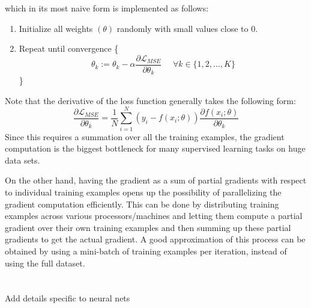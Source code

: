  which in its most naive form is implemented as follows:
\begin{enumerate}
\item Initialize all weights $(\theta)$ randomly with small values close to 0.
\item Repeat until convergence \{
\begin{equation*}
\theta_k := \theta_k - \alpha \frac{\partial \mathcal{L}_{MSE}}{\partial \theta_k} \hspace{16pt} \forall k \in \{1,2,...,K\}
\end{equation*}
\}
\end{enumerate}
Note that the derivative of the loss function generally takes the following form:
\begin{equation*}
\frac{\partial \mathcal{L}_{MSE}}{\partial \theta_k} = \frac{1}{N} \sum_{i=1}^N ( y_i - f(x_i; \theta)) \frac{\partial f(x_i; \theta)}{\partial \theta_k}
\end{equation*}
Since this requires a summation over all the training examples, the gradient computation is the biggest bottleneck for many supervised learning tasks on huge data sets.

On the other hand, having the gradient as a sum of partial gradients with respect to individual training examples opens up the possibility of parallelizing the gradient computation efficiently.
This can be done by distributing training examples across various processors/machines and letting them compute a partial gradient over their own training examples and then summing up these partial gradients to get the actual gradient.
A good approximation of this process can be obtained by using a mini-batch of training examples per iteration, instead of using the full dataset.
\\
\\
\\
Add details specific to neural nets
